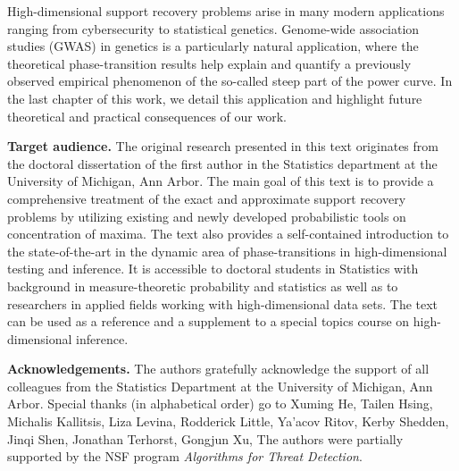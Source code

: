 High-dimensional support recovery problems arise in many modern applications ranging from cybersecurity to  statistical genetics.  
Genome-wide association studies (GWAS) in genetics is a particularly natural application, where the theoretical phase-transition results help 
explain and quantify a previously observed empirical phenomenon of the so-called steep part of the power curve.  
In the last chapter of this work, we detail this application and highlight future theoretical and practical consequences of our work.


{\bf Target audience.} The original research presented in this text originates from the doctoral dissertation of the first author in the 
Statistics department at the University of Michigan, Ann Arbor.  The main goal of this text is to provide a comprehensive treatment of the
exact and approximate support recovery problems by utilizing existing and newly developed probabilistic tools on concentration of maxima.
The text also provides a self-contained introduction to the state-of-the-art in the dynamic area of phase-transitions in high-dimensional 
testing and inference.  It is accessible to doctoral students in Statistics with background in measure-theoretic probability and  
statistics as well as to researchers in applied fields working with high-dimensional data sets.  The text can be used as a reference and a
supplement to a special topics course on high-dimensional inference.

{\bf Acknowledgements.} The authors gratefully acknowledge the support of all colleagues from the Statistics Department at the 
University of Michigan, Ann Arbor.   Special thanks (in alphabetical order) go to Xuming He, Tailen Hsing, Michalis Kallitsis, Liza Levina, 
Rodderick Little, Ya'acov Ritov, Kerby Shedden, Jinqi Shen, Jonathan Terhorst, Gongjun Xu, 
The authors were partially supported by the NSF program {\em Algorithms for Threat Detection}.


